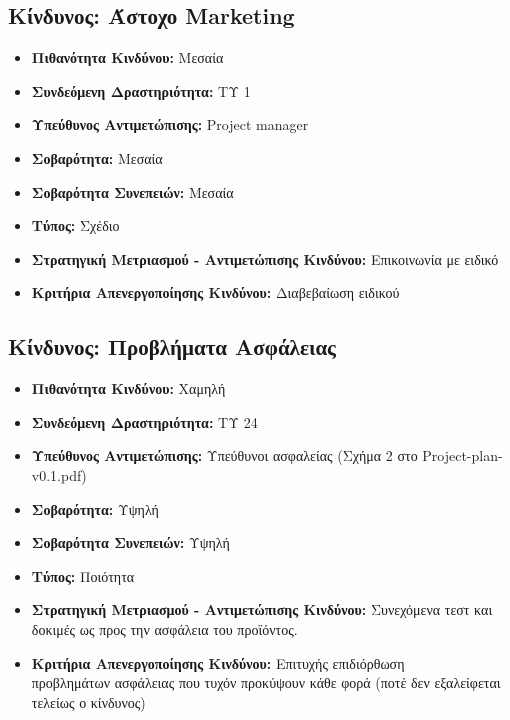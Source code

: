 \documentclass[12pt,a4paper]{article}
\begin{document}
\subsection{Κίνδυνος: Άστοχο Marketing}
\begin{itemize}
	\item \textbf{Πιθανότητα Κινδύνου:} Μεσαία
	\item \textbf{Συνδεόμενη Δραστηριότητα:} ΤΥ 1
	\item \textbf{Υπεύθυνος Αντιμετώπισης:} Project manager
	\item \textbf{Σοβαρότητα:} Μεσαία
	\item \textbf{Σοβαρότητα Συνεπειών:} Μεσαία
	\item \textbf{Τύπος:} Σχέδιο
	\item \textbf{Στρατηγική Μετριασμού - Αντιμετώπισης Κινδύνου:} Επικοινωνία με ειδικό
	\item \textbf{Κριτήρια Απενεργοποίησης Κινδύνου:} Διαβεβαίωση ειδικού
\end{itemize}

\subsection{Κίνδυνος: Προβλήματα Ασφάλειας}
\begin{itemize}
	\item \textbf{Πιθανότητα Κινδύνου:} Χαμηλή
	\item \textbf{Συνδεόμενη Δραστηριότητα:} ΤΥ 24
	\item \textbf{Υπεύθυνος Αντιμετώπισης:} Υπεύθυνοι ασφαλείας (Σχήμα 2 στο Project-plan-v0.1.pdf)
	\item \textbf{Σοβαρότητα:} Υψηλή
	\item \textbf{Σοβαρότητα Συνεπειών:} Υψηλή
	\item \textbf{Τύπος:} Ποιότητα
	\item \textbf{Στρατηγική Μετριασμού - Αντιμετώπισης Κινδύνου:} Συνεχόμενα τεστ και δοκιμές ως προς την ασφάλεια του προϊόντος.
	\item \textbf{Κριτήρια Απενεργοποίησης Κινδύνου:} Επιτυχής επιδιόρθωση \\προβλημάτων ασφάλειας που τυχόν προκύψουν κάθε φορά (ποτέ δεν εξαλείφεται τελείως ο κίνδυνος)
\end{itemize}
\end{document}

